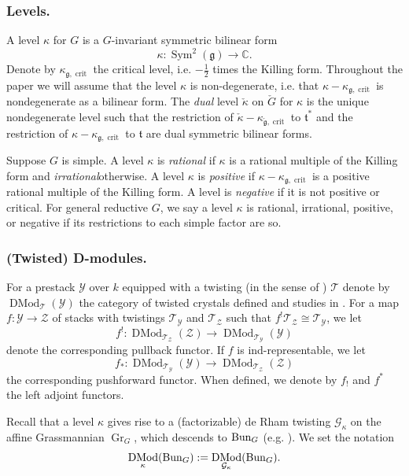 \documentclass[9pt]{amsart}
\DeclareMathOperator{\Gra}{{Gr}}
\newcommand{\bC}{{\mathbb C}}
\newcommand{\cG}{{\mathcal G}}
\newcommand{\cT}{{\mathcal T}}
\newcommand{\cY}{{\mathcal Y}}
\newcommand{\cZ}{{\mathcal Z}}
\DeclareMathOperator{\Sym}{{Sym}}
\numberwithin{equation}{section}
\DeclareMathOperator{\D}{{DMod}}
\begin{document}
\subsubsection{Levels.} A level $\kappa$ for $G$ is a $G$-invariant symmetric bilinear form 
$$\kappa: \Sym^2(\mathfrak{g}) \rightarrow \bC.$$
Denote by $\kappa_{\mathfrak{g}, \operatorname{crit}}$ the critical level, i.e. $-\frac{1}{2}$ times the Killing form. 
Throughout the paper we will assume that the level $\kappa$ is non-degenerate, i.e. that $\kappa - \kappa_{\mathfrak{g}, \operatorname{crit}}$ is nondegenerate as a bilinear form. The {\it dual} level $\check{\kappa}$ on $\check{G}$ for $\kappa$ is the unique nondegenerate level such that the restriction of $\check{\kappa} - \kappa_{\check{\mathfrak{g}}, \operatorname{crit}}$ to $\mathfrak{t}^*$ and the restriction of $\kappa - \kappa_{\mathfrak{g}, \operatorname{crit}}$ to $\mathfrak{t}$ are dual symmetric bilinear forms.

Suppose $G$ is simple. A level $\kappa$ is {\it rational} if $\kappa$ is a rational multiple of the Killing form and {\it irrational}otherwise. A level $\kappa$ is {\it positive} if $\kappa - \kappa_{\mathfrak{g}, \operatorname{crit}}$ is a positive rational multiple of the Killing form. A level is {\it negative} if it is not positive or critical. For general reductive $G$, we say a level $\kappa$ is rational, irrational, positive, or negative if its restrictions to each simple factor are so.
	
	\subsubsection{(Twisted) D-modules.} 
	For a prestack $\cY$ over $k$ equipped with a twisting  (in the sense of \cite{GRCrys}) $\cT$ denote by $\D_{\cT}(\cY)$ the category of twisted crystals defined and studies in \cite{GRCrys}. For a map $f: \cY \rightarrow \cZ$ of stacks with twistings $\cT_{\cY}$ and $\cT_{\cZ}$ such that $f^!\cT_{\cZ} \cong \cT_{\cY}$, we let $$f^!: \D_{\cT_{\cZ}}(\cZ) \rightarrow \D_{\cT_{\cY}}(\cY)$$ denote the
corresponding pullback functor. If $f$ is ind-representable, we let $$f_*: \D_{\cT_{\cY}}(\cY) \rightarrow \D_{\cT_{\cZ}}(\cZ)$$ the
corresponding pushforward functor. When defined, we denote by $f_!$ and $f^*$ the left adjoint functors.
	
	
	Recall that a level $\kappa$ gives rise to a (factorizable) de Rham twisting $\cG_{\kappa}$ on the affine Grassmannian $\Gra_G$, which descends to $\operatorname{{Bun}}_{G}$ (e.g. \cite[10.1]{GLCII}). We set the notation 
	$$\D_{\kappa}(\Bun_G) := \D_{\cG_{\kappa}}(\Bun_G).$$
	
\end{document}
